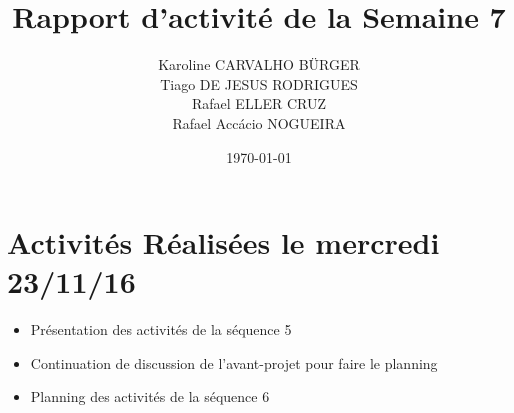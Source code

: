\documentclass[11pt,a4paper,onecolumn]{articlewithlogo}
\title{Rapport d'activité de la Semaine 7}
\author{Karoline CARVALHO BÜRGER\\ Tiago DE JESUS RODRIGUES\\  Rafael ELLER CRUZ \\Rafael Accácio NOGUEIRA }
\date{\today}
\begin{document}
\maketitle
\section{Activités Réalisées le mercredi 23/11/16  }
\begin{itemize}
	\renewcommand\labelitemi{$\circ$}
	\item Présentation des activités de la séquence 5 
	\item Continuation de discussion de l'avant-projet pour faire le planning
	\item Planning des activités de la séquence 6
	
\end{itemize}




%
\end{document}
